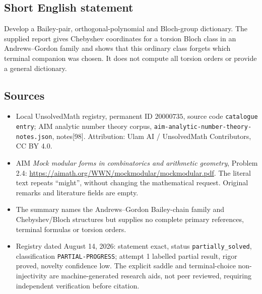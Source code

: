 \documentclass[11pt]{article}
\begin{document}
\subsection{Short English statement}
Develop a Bailey-pair, orthogonal-polynomial and Bloch-group dictionary. The supplied report gives Chebyshev coordinates for a torsion Bloch class in an Andrews--Gordon family and shows that this ordinary class forgets which terminal companion was chosen. It does not compute all torsion orders or provide a general dictionary.
\subsection{Sources}
\begin{itemize}
\item Local UnsolvedMath registry, permanent ID \(20000735\), source code \texttt{catalogue entry}; AIM analytic number theory corpus, \texttt{aim-analytic-number-theory-notes.json}, notes[98]. Attribution: Ulam AI / UnsolvedMath Contributors, CC BY 4.0.
\item AIM \emph{Mock modular forms in combinatorics and arithmetic geometry}, Problem 2.4: \url{https://aimath.org/WWN/mockmodular/mockmodular.pdf}. The literal text repeats ``might'', without changing the mathematical request. Original remarks and literature fields are empty.
\item The summary names the Andrews--Gordon Bailey-chain family and Chebyshev/Bloch structures but supplies no complete primary references, terminal formulas or torsion orders.
\item Registry dated August 14, 2026: statement exact, status \texttt{partially\_solved}, classification \texttt{PARTIAL-PROGRESS}; attempt 1 labelled partial result, rigor proved, novelty confidence low. The explicit saddle and terminal-choice non-injectivity are machine-generated research aids, not peer reviewed, requiring independent verification before citation.
\end{itemize}
\end{document}
